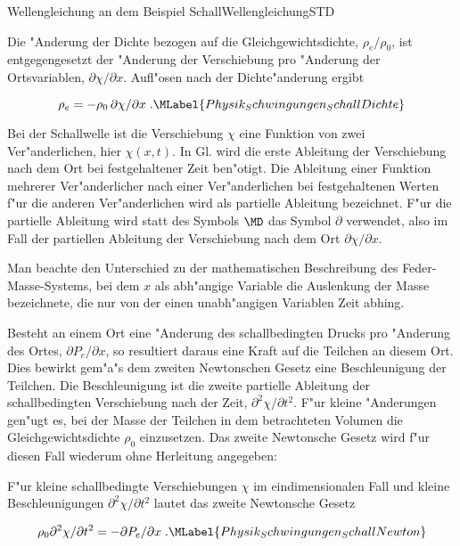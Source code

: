 \begin{MXContent}{Wellengleichung an dem Beispiel Schall}{Wellengleichung}{STD}
\begin{MInfo}
Die "Anderung der Dichte bezogen auf die Gleichgewichtsdichte, $\rho_e / \rho_0$, ist entgegengesetzt der "Anderung der Verschiebung pro "Anderung der Ortsvariablen, $\partial \chi / \partial x$. Aufl"osen nach der Dichte"anderung ergibt

\begin{equation}
  \rho_e = -\rho_0 \, \partial \chi / \partial x\; .\MLabel{Physik_Schwingungen_SchallDichte}
\end{equation}
\end{MInfo}

Bei der Schallwelle ist die Verschiebung $\chi$ eine Funktion von zwei Ver"anderlichen, hier $\chi(x,t)$. In Gl.  wird die erste Ableitung der Verschiebung nach dem Ort bei festgehaltener Zeit ben"otigt. Die Ableitung einer Funktion mehrerer Ver"anderlicher nach einer Ver"anderlichen bei festgehaltenen Werten f"ur die anderen Ver"anderlichen wird als partielle Ableitung bezeichnet. F"ur die partielle Ableitung wird statt des Symbols $\MD$ das Symbol $\partial$ verwendet, also im Fall der partiellen Ableitung der Verschiebung nach dem Ort $\partial \chi / \partial x$. 

Man beachte den Unterschied zu der mathematischen Beschreibung des Feder-Masse-Systems, bei dem $x$ als abh"angige Variable die Auslenkung der Masse bezeichnete, die nur von der einen unabh"angigen Variablen Zeit abhing.

Besteht an einem Ort eine "Anderung des schallbedingten Drucks pro "Anderung des Ortes, $\partial P_e / \partial x$, so resultiert daraus eine Kraft auf die Teilchen an diesem Ort. Dies bewirkt gem"a"s dem zweiten Newtonschen Gesetz eine Beschleunigung der Teilchen. Die Beschleunigung ist die zweite partielle Ableitung der schallbedingten Verschiebung nach der Zeit, $\partial^2 \chi / \partial t^2$. F"ur kleine "Anderungen gen"ugt es, bei der Masse der Teilchen in dem betrachteten Volumen die Gleichgewichtsdichte $\rho_0$ einzusetzen. Das zweite Newtonsche Gesetz wird f"ur diesen Fall wiederum ohne Herleitung angegeben:

\begin{MInfo}
F"ur kleine schallbedingte Verschiebungen $\chi$ im eindimensionalen Fall und kleine Beschleunigungen $\partial^2 \chi / \partial t^2$ lautet das zweite Newtonsche Gesetz

\begin{equation}
  \rho_0 \partial^2 \chi / \partial t^2 = -\partial P_e / \partial x\; .\MLabel{Physik_Schwingungen_SchallNewton}
\end{equation}


\end{MInfo}
\end{MXContent}
